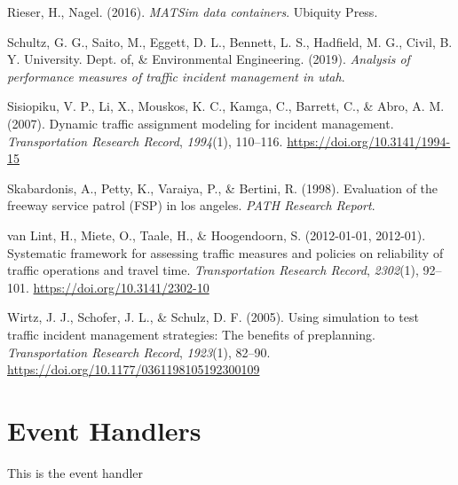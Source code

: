 \documentclass[fancy, oneside, mastersfancy, ms]{byuthesis}
\newlength{\cslhangindent}
\newlength{\cslentryspacingunit} %
\newenvironment{CSLReferences}[2] %
 {%
  \setlength{\parindent}{0pt}
  \ifodd #1
  \let\oldpar\par
  \def\par{\hangindent=\cslhangindent\oldpar}
  \fi
  \setlength{\parskip}{#2\cslentryspacingunit}
 }%
 {}
\begin{document}
\begin{CSLReferences}{1}{0}
\leavevmode{}%
Rieser, H., Nagel. (2016). \emph{MATSim data containers}. {Ubiquity
Press}.

\leavevmode{}%
Schultz, G. G., Saito, M., Eggett, D. L., Bennett, L. S., Hadfield, M.
G., Civil, B. Y. University. Dept. of, \& Environmental Engineering.
(2019). \emph{Analysis of performance measures of traffic incident
management in utah}.

\leavevmode{}%
Sisiopiku, V. P., Li, X., Mouskos, K. C., Kamga, C., Barrett, C., \&
Abro, A. M. (2007). Dynamic traffic assignment modeling for incident
management. \emph{Transportation Research Record}, \emph{1994}(1),
110--116. \url{https://doi.org/10.3141/1994-15}

\leavevmode{}%
Skabardonis, A., Petty, K., Varaiya, P., \& Bertini, R. (1998).
Evaluation of the freeway service patrol ({FSP}) in los angeles.
\emph{PATH Research Report}.

\leavevmode{}%
van Lint, H., Miete, O., Taale, H., \& Hoogendoorn, S. (2012-01-01,
2012-01). Systematic framework for assessing traffic measures and
policies on reliability of traffic operations and travel time.
\emph{Transportation Research Record}, \emph{2302}(1), 92--101.
\url{https://doi.org/10.3141/2302-10}

\leavevmode{}%
Wirtz, J. J., Schofer, J. L., \& Schulz, D. F. (2005). Using simulation
to test traffic incident management strategies: {The} benefits of
preplanning. \emph{Transportation Research Record}, \emph{1923}(1),
82--90. \url{https://doi.org/10.1177/0361198105192300109}

\end{CSLReferences}

\cleardoublepage
{}
{}
\appendix

\hypertarget{event-handlers}{%
\chapter{Event Handlers}\label{event-handlers}}

This is the event handler
\end{document}

